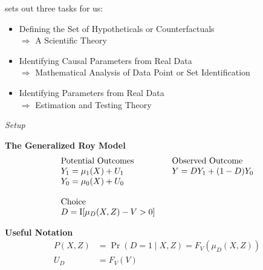 \begin{frame}
	 sets out three tasks for us:
	\begin{itemize}\setlength\itemsep{1em}
		\item Defining the Set of Hypotheticals or Counterfactuals \\\hspace{0.3cm}
		$\Rightarrow$ A Scientific Theory
		\item Identifying Causal Parameters from Real Data \\\hspace{0.3cm}
		$\Rightarrow$ Mathematical Analysis of  Data Point or Set Identification
		\item Identifying Parameters from Real Data\\\hspace{0.3cm}
		$\Rightarrow$ Estimation and Testing Theory
	\end{itemize}	
\end{frame}
\begin{frame}\begin{center}
		\LARGE\textit{Setup}
\end{center}\end{frame}
\begin{frame}
	\textbf{The Generalized Roy Model}
	\begin{align*}\begin{array}{l@{\qquad}l}
			\text{Potential Outcomes} &\text{Observed Outcome}\\
			Y_1 = \mu_1(X) + U_1      &  Y = D Y_1 + (1 - D)Y_0 \\
			Y_0 = \mu_0(X) + U_0      &\\
			& \\
			\text{Choice} & \\
			D = \mathrm{I}[\mu_D(X, Z) - V > 0] & \\
		\end{array}
	\end{align*}
\end{frame}
\begin{frame}
	\textbf{Useful Notation}
	\begin{align*}
		P(X, Z) & = \Pr(D = 1\mid X, Z) = F_V(\mu_D(X, Z)) \\
		U_D     & = F_V(V)
	\end{align*}	
\end{frame}
